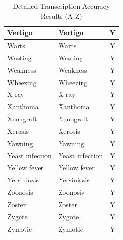 \begin{table}[H]
\begin{minipage}[t]{0.48\textwidth}
\begin{tabular}{|l|l|c|}
Vertigo & Vertigo & Y \\ \hline
Warts & Warts & Y \\ \hline
Wasting & Wasting & Y \\ \hline
Weakness & Weakness & Y \\ \hline
Wheezing & Wheezing & Y \\ \hline
X-ray & X-ray & Y \\ \hline
Xanthoma & Xanthoma & Y \\ \hline
Xenograft & Xenograft & Y \\ \hline
Xerosis & Xerosis & Y \\ \hline
Yawning & Yawning & Y \\ \hline
Yeast infection & Yeast infection & Y \\ \hline
Yellow fever & Yellow fever & Y \\ \hline
Yersiniosis & Yersiniosis & Y \\ \hline
Zoonosis & Zoonosis & Y \\ \hline
Zoster & Zoster & Y \\ \hline
Zygote & Zygote & Y \\ \hline
Zymotic & Zymotic & Y \\ \hline
\end{tabular}
\end{minipage}

\caption{Detailed Transcription Accuracy Results (A-Z)}
\label{tab:test_transcription}
\end{table}